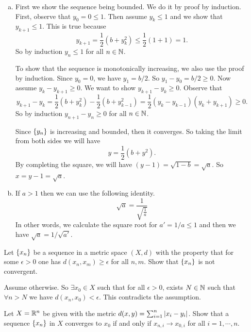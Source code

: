 \begin{solution}
	\begin{enumerate}[(a)]
		\item First we show the sequence being bounded. We do it by proof by induction. First, observe that $ y_0  = 0 \leq1 $. Then assume $ y_k \leq 1 $ and we show that $ y_{k+1} \leq 1 $. This is true because
		\[ y_{k+1} = \frac{1}{2} (b+y_k^2) \leq \frac{1}{2} (1+1) = 1. \]
		So by induction $ y_n \leq 1 $ for all $ n\in \mathbb{N} $.
		
		To show that the sequence is monotonically increasing, we also use the proof by induction. Since $ y_0 = 0 $, we have $ y_1 = b/2 $. So $ y_1 - y_0 = b/2 \geq 0 $. Now assume $ y_{k} - y_{k+1} \geq 0 $. We want to show $ y_{k+1} - y_k \geq 0 $. Observe that
		\[ y_{k+1}-y_k = \frac{1}{2}(b+y_k^2) - \frac{1}{2}(b+y_{k-1}^2) = \frac{1}{2}(y_{k}-y_{k-1})(y_k+y_{k+1}) \geq 0.\]
		So by induction $ y_{n+1} - y_n \geq 0 $ for all $ n\in \mathbb{N} $. 
		
		Since $ \{y_n\} $ is increasing and bounded, then it converges. So taking the limit from both sides we will have
		\[ y = \frac{1}{2}(b+y^2). \]
		By completing the square, we will have $ (y-1) = \sqrt{1-b} = \sqrt{a} $. So $ x = y - 1 = \sqrt{a} $.
		
		\item If $ a >1 $ then we can use the following identity.
		\[ \sqrt{a} = \frac{1}{\sqrt{\frac{1}{a}}} \]
		In other words, we calculate the square root for $ a'=1/a \leq 1 $ and then we have $ \sqrt{a} = 1/\sqrt{a'} $.
	\end{enumerate}
	
\end{solution}


\begin{problem}
	Let $ \{x_n\} $ be a sequence in a metric space $ (X,d) $ with the property that for some $ \epsilon>0 $ one has $ d(x_n,x_m) \geq \epsilon $ for all $ n,m $. Show that $ \{x_n\} $ is not convergent.
\end{problem}
\begin{solution}
	Assume otherwise. So $ \exists x_0 \in X $ such that for all $ \epsilon>0 $, exists $ N\in \mathbb{N} $ such that $ \forall n>N $ we have $ d(x_n,x_0)<\epsilon $. This contradicts the assumption.
\end{solution}





\begin{problem}
	Let $ X = \mathbb{R}^n $ be given with the metric $ d(x,y) = \sum_{i=1}^n\left|x_i - y_i\right| $. Show that a sequence $ \{x_n\} $ in $ X $ converges to $ x_0 $ if and only if  $ x_{n,i}\to x_{0,i} $ for all $ i=1,\cdots,n $.
\end{problem}

